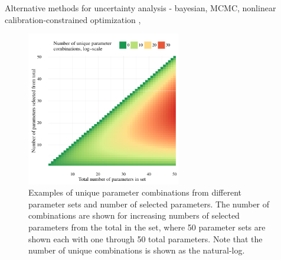 \documentclass[letterpaper,12pt,oneside]{article}\usepackage[]{graphicx}\usepackage[]{color}
\begin{document}
Alternative methods for uncertainty analysis - bayesian, MCMC, nonlinear calibration-constrained optimization \citep{Gallagher07}, \citep{Arhonditsis08}

\clearpage
\begin{singlespace}


\end{singlespace}
\clearpage


\begin{figure}[!ht]

{\centering \includegraphics[width=0.6\textwidth]{figs/combnex-1} 

}

\caption[Examples of unique parameter combinations from different parameter sets and number of selected parameters]{Examples of unique parameter combinations from different parameter sets and number of selected parameters.  The number of combinations are shown for increasing numbers of selected parameters from the total in the set, where 50 parameter sets are shown each with one through 50 total parameters. Note that the number of unique combinations is shown as the natural-log.}\label{fig:combnex}
\end{figure}
\end{document}

